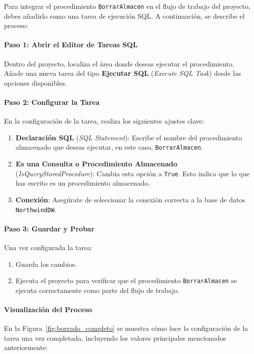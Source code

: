\documentclass{article}
\begin{document}
	Para integrar el procedimiento \texttt{BorrarAlmacen} en el flujo de trabajo del proyecto, debes añadirlo como una tarea de ejecución SQL. A continuación, se describe el proceso:
	
	\paragraph{Paso 1: Abrir el Editor de Tareas SQL}  
	Dentro del proyecto, localiza el área donde deseas ejecutar el procedimiento. Añade una nueva tarea del tipo \textbf{Ejecutar SQL} (\textit{Execute SQL Task}) desde las opciones disponibles.
	
	\paragraph{Paso 2: Configurar la Tarea}  
	En la configuración de la tarea, realiza los siguientes ajustes clave:
	\begin{enumerate}
		\item \textbf{Declaración SQL} (\textit{SQL Statement}): Escribe el nombre del procedimiento almacenado que deseas ejecutar, en este caso, \texttt{BorrarAlmacen}.
		\item \textbf{Es una Consulta o Procedimiento Almacenado} (\textit{IsQueryStoredProcedure}): Cambia esta opción a \texttt{True}. Esto indica que lo que has escrito es un procedimiento almacenado.
		\item \textbf{Conexión}: Asegúrate de seleccionar la conexión correcta a la base de datos \texttt{NorthwindDW}.
	\end{enumerate}
	
	\paragraph{Paso 3: Guardar y Probar}  
	Una vez configurada la tarea:
	\begin{enumerate}
		\item Guarda los cambios.
		\item Ejecuta el proyecto para verificar que el procedimiento \texttt{BorrarAlmacen} se ejecuta correctamente como parte del flujo de trabajo.
	\end{enumerate}
	
	\paragraph{Visualización del Proceso}  
	En la Figura~\ref{fig:borrado_completo} se muestra cómo luce la configuración de la tarea una vez completada, incluyendo los valores principales mencionados anteriormente:
	
\end{document}
